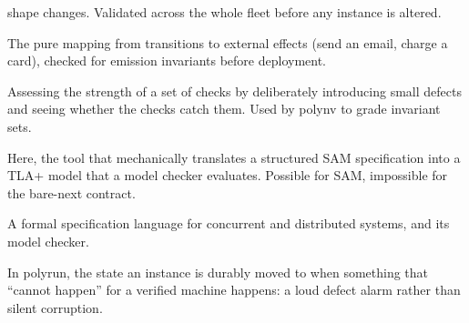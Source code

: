 \documentclass[11pt]{article}
\newcommand{\tool}[1]{\textsf{#1}}
\begin{document}
\begin{description}[leftmargin=0pt, style=nextline]
  shape changes. Validated across the whole fleet before any instance is
  altered.
\item[Effect mapper] The pure mapping from transitions to external effects (send
  an email, charge a card), checked for emission invariants before deployment.
\item[Mutation testing] Assessing the strength of a set of checks by
  deliberately introducing small defects and seeing whether the checks catch
  them. Used by \tool{polynv} to grade invariant sets.
\item[Transpiler] Here, the tool that mechanically translates a structured SAM
  specification into a TLA+ model that a model checker evaluates. Possible for
  SAM, impossible for the bare-next contract.
\item[TLA+ / TLC] A formal specification language for concurrent and
  distributed systems, and its model checker.
\item[Poison] In \tool{polyrun}, the state an instance is durably moved to when
  something that ``cannot happen'' for a verified machine happens: a loud defect
  alarm rather than silent corruption.
\end{description}
\end{document}
